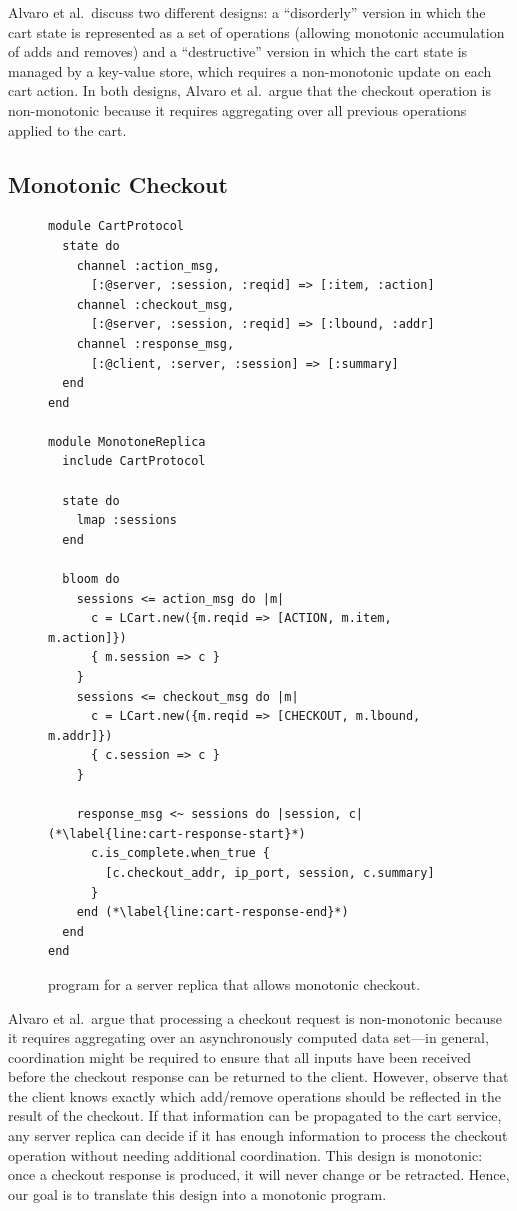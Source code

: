 Alvaro et al.\ discuss two different designs: a ``disorderly'' version in which
the cart state is represented as a set of operations (allowing monotonic
accumulation of adds and removes) and a ``destructive'' version in which the
cart state is managed by a key-value store, which requires a non-monotonic
update on each cart action. In both designs, Alvaro et al.\ argue that the
checkout operation is non-monotonic because it requires aggregating over all
previous operations applied to the cart.

\subsection{Monotonic Checkout}
\begin{figure}[t]
\begin{scriptsize}

\begin{lstlisting}
module CartProtocol
  state do
    channel :action_msg,
      [:@server, :session, :reqid] => [:item, :action]
    channel :checkout_msg,
      [:@server, :session, :reqid] => [:lbound, :addr]
    channel :response_msg,
      [:@client, :server, :session] => [:summary]
  end
end

module MonotoneReplica
  include CartProtocol

  state do
    lmap :sessions
  end

  bloom do
    sessions <= action_msg do |m|
      c = LCart.new({m.reqid => [ACTION, m.item, m.action]})
      { m.session => c }
    }
    sessions <= checkout_msg do |m|
      c = LCart.new({m.reqid => [CHECKOUT, m.lbound, m.addr]})
      { c.session => c }
    }

    response_msg <~ sessions do |session, c| (*\label{line:cart-response-start}*)
      c.is_complete.when_true {
        [c.checkout_addr, ip_port, session, c.summary]
      }
    end (*\label{line:cart-response-end}*)
  end
end
\end{lstlisting}
\end{scriptsize}
\caption{\lang program for a server replica that allows monotonic checkout.}
\label{fig:monotone-cart}
\end{figure}

Alvaro et al.\ argue that processing a checkout request is non-monotonic because
it requires aggregating over an asynchronously computed data set---in general,
coordination might be required to ensure that all inputs have been received
before the checkout response can be returned to the client. However, observe
that the client knows exactly which add/remove operations should be reflected in
the result of the checkout. If that information can be propagated to the cart
service, any server replica can decide if it has enough information to process
the checkout operation without needing additional coordination. This design is
monotonic: once a checkout response is produced, it will never change or be
retracted. Hence, our goal is to translate this design into a monotonic \lang
program.

